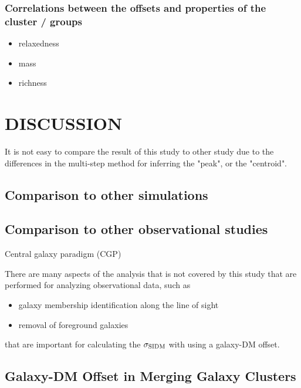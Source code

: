 \subsubsection{Correlations between the offsets and properties of the 
cluster / groups}
\begin{itemize}
\item relaxedness
\item mass 
\item richness  
\end{itemize}


\section{DISCUSSION}\label{sec:discussion}
It is not easy to compare the result of this study to other study due to the 
differences in the multi-step method for inferring the "peak", or the
"centroid".

\subsection{Comparison to other simulations}

\subsection{Comparison to other observational studies}
Central galaxy paradigm (CGP)


There are many aspects of the analysis that is not covered by this study that
are performed for analyzing observational data, such as 

\begin{itemize}
		\item galaxy membership identification along the line of sight
		\item removal of foreground galaxies  
	\end{itemize}
	that are important for calculating the $\sigma_{\rm SIDM}$ with using a
	galaxy-DM offset. 


\subsection{Galaxy-DM Offset in Merging Galaxy Clusters}

